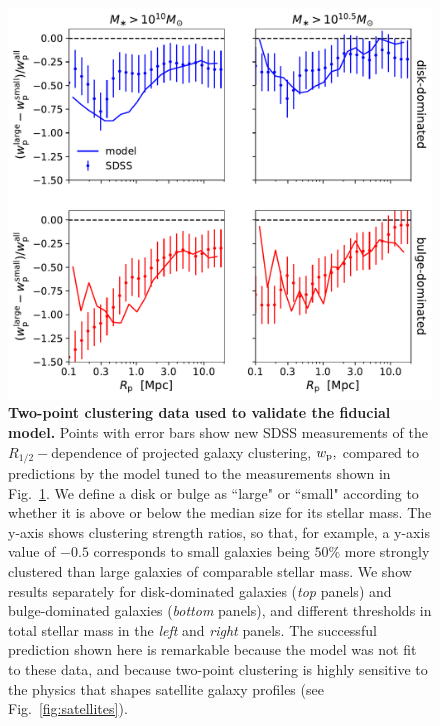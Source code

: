 \documentclass[usenatbib,usegraphicx,letterpaper]{mn2e}
\newcommand{\rhalf}{R_{1/2}}
\newcommand{\wproj}{w_{\rm p}}
\begin{document}
\begin{figure}
\centering
\includegraphics[width=12cm]{FIGS/size_clustering_ratios_bt_decomposition_model_vs_sdss.pdf}
\caption{
{\bf Two-point clustering data used to validate the fiducial model.}
Points with error bars show new SDSS measurements of the $\rhalf-$dependence of projected galaxy clustering, $\wproj,$ compared to predictions by the model tuned to the measurements shown in Fig.~\ref{fig:scatter_plot}. We define a disk or bulge as ``large" or ``small" according to whether it is above or below the median size for its stellar mass. The y-axis shows clustering strength ratios, so that, for example, a y-axis value of $-0.5$ corresponds to small galaxies being $50\%$ more strongly clustered than large galaxies of comparable stellar mass. We show results separately for disk-dominated galaxies ({\em top} panels) and bulge-dominated galaxies ({\em bottom }panels), and different thresholds in total stellar mass in the {\em left} and {\em right} panels. The successful prediction shown here is remarkable because the model was not fit to these data, and because two-point clustering is highly sensitive to the physics that shapes satellite galaxy profiles (see Fig.~\ref{fig:satellites}). 
}
\label{fig:scatter_plot}
\end{figure}
\end{document}
